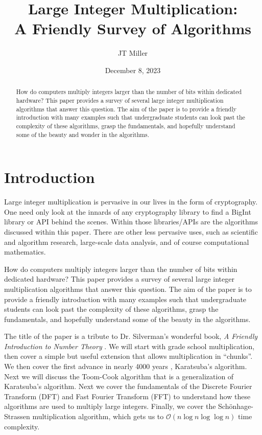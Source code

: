 \documentclass[psamsfonts,reqno]{amsart}
\theoremstyle{definition}
\theoremstyle{remark}
\numberwithin{equation}{section}
\begin{document}
\title{Large Integer Multiplication:\\A Friendly Survey of Algorithms}
\date{December 8, 2023}

\author{JT Miller}
\address{University of Illinois at Springfield}

\begin{abstract}

How do computers multiply integers larger than the number of bits within dedicated hardware? This paper provides a survey of several large integer multiplication algorithms that answer this question. The aim of the paper is to provide a friendly introduction with many examples such that undergraduate students can look past the complexity of these algorithms, grasp the fundamentals, and hopefully understand some of the beauty and wonder in the algorithms. 

\end{abstract}

\maketitle


\tableofcontents

\section{Introduction}

Large integer multiplication is pervasive in our lives in the form of cryptography. One need only look at the innards of any cryptography library to find a BigInt library or API behind the scenes. Within those libraries/APIs are the algorithms discussed within this paper. There are other less pervasive uses, such as scientific and algorithm research, large-scale data analysis, and of course computational mathematics. 

How do computers multiply integers larger than the number of bits within dedicated hardware? This paper provides a survey of several large integer multiplication algorithms that answer this question. The aim of the paper is to provide a friendly introduction with many examples such that undergraduate students can look past the complexity of these algorithms, grasp the fundamentals, and hopefully understand some of the beauty in the algorithms. 

The title of the paper is a tribute to Dr. Silverman's wonderful book, \textit{A Friendly Introduction to Number Theory} \cite{silverman2014friendly}. We will start with grade school multiplication, then cover a simple but useful extension that allows multiplication in ``chunks''. We then cover the first advance in nearly 4000 years \cite{burton1985history}, Karatsuba's algorithm. Next we will discuss the Toom-Cook algorithm that is a generalization of Karatsuba's algorithm. Next we cover the fundamentals of the Discrete Fourier Transform (DFT) and Fast Fourier Transform (FFT) to understand how these algorithms are used to multiply large integers. Finally, we cover the Sch\"{o}nhage-Strassen multiplication algorithm, which gets us to $\mathcal{O}(n \log{n} \log{\log{n}})$ time complexity.
\end{document}
